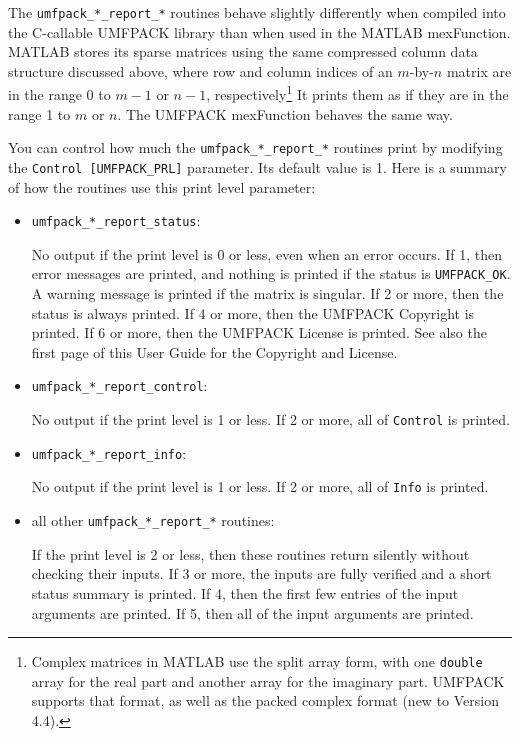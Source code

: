 \documentclass[11pt]{article}
\begin{document}
The {\tt umfpack\_*\_report\_*} routines behave slightly differently when
compiled
into the C-callable UMFPACK library than when used in the MATLAB mexFunction.
MATLAB stores its sparse matrices using the same compressed column data
structure discussed above, where row and column indices of an $m$-by-$n$
matrix are in the range 0 to $m-1$ or $n-1$, respectively\footnote{Complex
matrices in MATLAB use the split array form, with one {\tt double} array
for the real part and another array for the imaginary part.  UMFPACK
supports that format, as well as the packed complex format (new to Version 4.4).}
It prints them as if they are in the range 1 to $m$ or $n$.
The UMFPACK mexFunction behaves the same way.

You can control how much the {\tt umfpack\_*\_report\_*} routines print by
modifying the {\tt Control [UMFPACK\_PRL]} parameter.  Its default value is 1.
Here is a summary of how the routines use this print level parameter:

\begin{itemize}
\item {\tt umfpack\_*\_report\_status}:

    No output if the print level is 0 or less, even when an error occurs.
    If 1, then error messages are printed, and nothing is printed if
    the status is {\tt UMFPACK\_OK}.  A warning message is printed if
    the matrix is singular.  If 2 or more, then the status is always
    printed.  If 4 or more, then the UMFPACK Copyright is printed.
    If 6 or more, then the UMFPACK License is printed.  See also the first page
    of this User Guide for the Copyright and License.

\item {\tt umfpack\_*\_report\_control}:

    No output if the print level is 1 or less.  If 2 or more, all of
    {\tt Control} is printed.

\item {\tt umfpack\_*\_report\_info}:

    No output if the print level is 1 or less.  If 2 or more, all of
    {\tt Info} is printed.

\item all other {\tt umfpack\_*\_report\_*} routines:

    If the print level is 2 or less, then these routines return silently without
    checking their inputs.  If 3 or more, the inputs are fully verified and a
    short status summary is printed.  If 4, then the first few entries of the
    input arguments are printed.  If 5, then all of the input arguments are
    printed.

\end{itemize}
\end{document}
